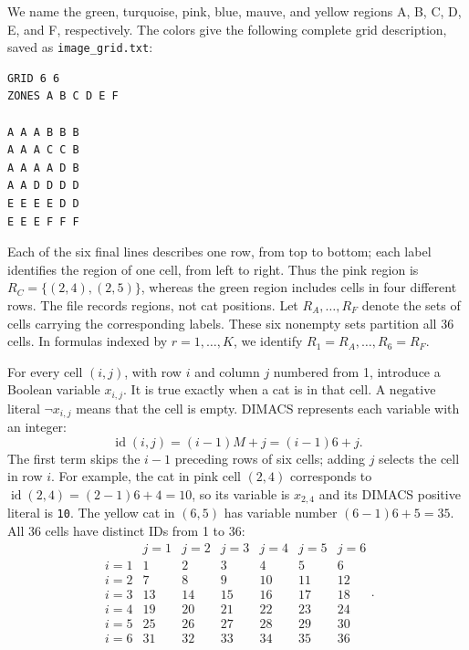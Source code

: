 We name the green, turquoise, pink, blue, mauve, and yellow regions A, B, C, D, E, and F, respectively. The colors give the following complete grid description, saved as \texttt{image\_grid.txt}:
\begin{verbatim}
GRID 6 6
ZONES A B C D E F

A A A B B B
A A A C C B
A A A A D B
A A D D D D
E E E E D D
E E E F F F
\end{verbatim}
Each of the six final lines describes one row, from top to bottom; each label identifies the region of one cell, from left to right. Thus the pink region is $R_C=\{(2,4),(2,5)\}$, whereas the green region includes cells in four different rows. The file records regions, not cat positions. Let $R_A,\ldots,R_F$ denote the sets of cells carrying the corresponding labels. These six nonempty sets partition all 36 cells. In formulas indexed by $r=1,\ldots,K$, we identify $R_1=R_A,\ldots,R_6=R_F$.

For every cell $(i,j)$, with row $i$ and column $j$ numbered from 1, introduce a Boolean variable $x_{i,j}$. It is true exactly when a cat is in that cell. A negative literal $\neg x_{i,j}$ means that the cell is empty. DIMACS represents each variable with an integer:
\[
\operatorname{id}(i,j)=(i-1)M+j=(i-1)6+j.
\]
The first term skips the $i-1$ preceding rows of six cells; adding $j$ selects the cell in row $i$. For example, the cat in pink cell $(2,4)$ corresponds to $\operatorname{id}(2,4)=(2-1)6+4=10$, so its variable is $x_{2,4}$ and its DIMACS positive literal is \texttt{10}. The yellow cat in $(6,5)$ has variable number $(6-1)6+5=35$. All 36 cells have distinct IDs from 1 to 36:
\[
\begin{array}{c|rrrrrr}
 & j=1&j=2&j=3&j=4&j=5&j=6\\ \hline
 i=1&1&2&3&4&5&6\\
 i=2&7&8&9&10&11&12\\
 i=3&13&14&15&16&17&18\\
 i=4&19&20&21&22&23&24\\
 i=5&25&26&27&28&29&30\\
 i=6&31&32&33&34&35&36
\end{array}.
\]

